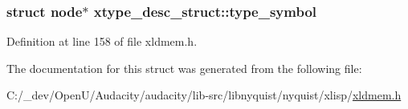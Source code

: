 \subsubsection[{\texorpdfstring{type\+\_\+symbol}{type_symbol}}]{\setlength{\rightskip}{0pt plus 5cm}struct {\bf node}$\ast$ xtype\+\_\+desc\+\_\+struct\+::type\+\_\+symbol}\hypertarget{structxtype__desc__struct_ab1ae78715eb721572b404dd2577aae50}{}\label{structxtype__desc__struct_ab1ae78715eb721572b404dd2577aae50}


Definition at line 158 of file xldmem.\+h.



The documentation for this struct was generated from the following file\+:\begin{DoxyCompactItemize}
\item 
C\+:/\+\_\+dev/\+Open\+U/\+Audacity/audacity/lib-\/src/libnyquist/nyquist/xlisp/\hyperlink{xldmem_8h}{xldmem.\+h}\end{DoxyCompactItemize}
